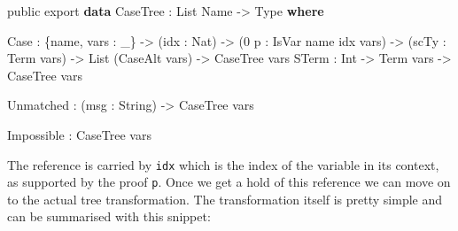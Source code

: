 \documentclass[
]{article}
\newenvironment{Shaded}{}{}
\newcommand{\DataTypeTok}[1]{\textcolor[rgb]{0.56,0.13,0.00}{#1}}
\newcommand{\DecValTok}[1]{\textcolor[rgb]{0.25,0.63,0.44}{#1}}
\newcommand{\KeywordTok}[1]{\textcolor[rgb]{0.00,0.44,0.13}{\textbf{#1}}}
\newcommand{\NormalTok}[1]{#1}
\newcommand{\OperatorTok}[1]{\textcolor[rgb]{0.40,0.40,0.40}{#1}}
\newcommand{\OtherTok}[1]{\textcolor[rgb]{0.00,0.44,0.13}{#1}}
\begin{document}
\begin{Shaded}
\begin{Highlighting}[]
\NormalTok{  public export}
  \KeywordTok{data} \DataTypeTok{CaseTree} \OperatorTok{:} \DataTypeTok{List} \DataTypeTok{Name} \OtherTok{{-}\textgreater{}} \DataTypeTok{Type} \KeywordTok{where}

       \DataTypeTok{Case} \OperatorTok{:}\NormalTok{ \{name, vars }\OperatorTok{:}\NormalTok{ \_\} }\OtherTok{{-}\textgreater{}}
\NormalTok{              (idx }\OperatorTok{:} \DataTypeTok{Nat}\NormalTok{) }\OtherTok{{-}\textgreater{}}
\NormalTok{              (}\DecValTok{0}\NormalTok{ p }\OperatorTok{:} \DataTypeTok{IsVar}\NormalTok{ name idx vars) }\OtherTok{{-}\textgreater{}}
\NormalTok{              (scTy }\OperatorTok{:} \DataTypeTok{Term}\NormalTok{ vars) }\OtherTok{{-}\textgreater{}} \DataTypeTok{List}\NormalTok{ (}\DataTypeTok{CaseAlt}\NormalTok{ vars) }\OtherTok{{-}\textgreater{}}
              \DataTypeTok{CaseTree}\NormalTok{ vars}
       \DataTypeTok{STerm} \OperatorTok{:} \DataTypeTok{Int} \OtherTok{{-}\textgreater{}} \DataTypeTok{Term}\NormalTok{ vars }\OtherTok{{-}\textgreater{}} \DataTypeTok{CaseTree}\NormalTok{ vars}

       \DataTypeTok{Unmatched} \OperatorTok{:}\NormalTok{ (msg }\OperatorTok{:} \DataTypeTok{String}\NormalTok{) }\OtherTok{{-}\textgreater{}} \DataTypeTok{CaseTree}\NormalTok{ vars}

       \DataTypeTok{Impossible} \OperatorTok{:} \DataTypeTok{CaseTree}\NormalTok{ vars}
\end{Highlighting}
\end{Shaded}

The reference is carried by \texttt{idx} which is the index of the
variable in its context, as supported by the proof \texttt{p}. Once we
get a hold of this reference we can move on to the actual tree
transformation. The transformation itself is pretty simple and can be
summarised with this snippet:
\end{document}

